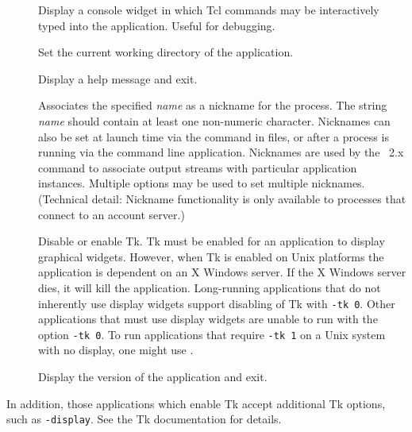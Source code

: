 \begin{description}
\item[]
Display a console widget in which Tcl
commands may be interactively typed into the application.
Useful for debugging.

\item[]
Set the current working directory of the application.

\item[]
Display a help message and exit.

\item[]
Associates the specified \textit{name} as a nickname for the process.
The string \textit{name} should contain at least one non-numeric
character.  Nicknames can also be set at launch time via the
 command in  files, or
after a process is running via the
command line application.  Nicknames are used by the \MIF\ 2.x
 command to associate  output streams with
particular application instances.  Multiple  options may
be used to set multiple nicknames.  (Technical detail: Nickname
functionality is only available to processes that connect to an
account server.)

\item[]
Disable or enable Tk.  Tk must be enabled for an application to display
graphical widgets.  However, when Tk is enabled on Unix platforms
the application is dependent on an X Windows server.  If the 
X Windows server dies, it will kill the application.  Long-running
applications that do not inherently use display widgets support
disabling of Tk with \verb+-tk 0+.  
Other applications that must use display widgets are unable to run
with the option \verb+-tk 0+.  To run applications that require
\verb+-tk 1+ on a Unix system with no display, one might use
.

\item[]
Display the version of the application and exit.
\end{description}

In addition, those applications which enable Tk accept additional Tk
options, such as \verb+-display+.  See the Tk documentation for details.


